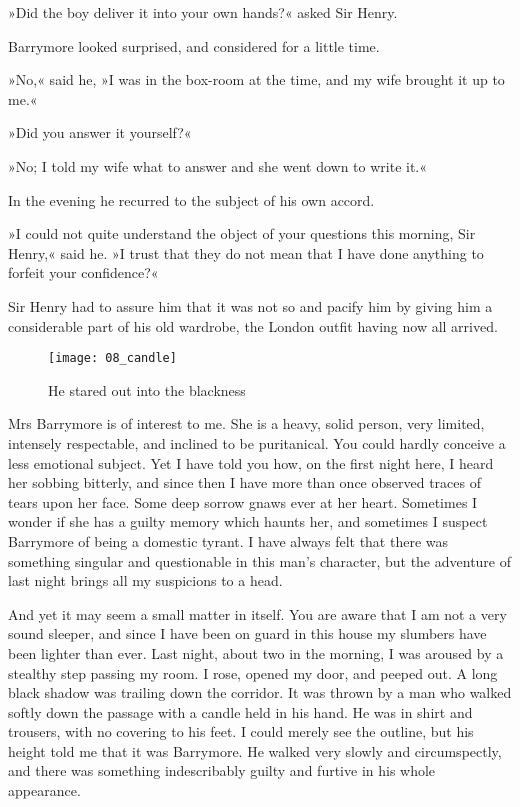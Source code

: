 »Did the boy deliver it into your own hands?« asked Sir Henry.

Barrymore looked surprised, and considered for a little time.

»No,« said he, »I was in the box-room at the time, and my wife brought it up to me.«

»Did you answer it yourself?«

»No; I told my wife what to answer and she went down to write it.«

In the evening he recurred to the subject of his own accord.

»I could not quite understand the object of your questions this morning, Sir Henry,« said he. »I trust that they do not mean that I have done anything to forfeit your confidence?«

Sir Henry had to assure him that it was not so and pacify him by giving him a considerable part of his old wardrobe, the London outfit having now all arrived.

\begin{wrapfigure}[20]{O}{0.7\textwidth}
\centering
\texttt{[image: 08\_candle]}
\caption{He stared out into the blackness}
\end{wrapfigure}

Mrs Barrymore is of interest to me. She is a heavy, solid person, very limited, intensely respectable, and inclined to be puritanical. You could hardly conceive a less emotional subject. Yet I have told you how, on the first night here, I heard her sobbing bitterly, and since then I have more than once observed traces of tears upon her face. Some deep sorrow gnaws ever at her heart. Sometimes I wonder if she has a guilty memory which haunts her, and sometimes I suspect Barrymore of being a domestic tyrant. I have always felt that there was something singular and questionable in this man's character, but the adventure of last night brings all my suspicions to a head.

And yet it may seem a small matter in itself. You are aware that I am not a very sound sleeper, and since I have been on guard in this house my slumbers have been light\-er than ever. Last night, about two in the morning, I was aroused by a stealthy step pass\-ing my room. I rose, opened my door, and peeped out. A long black sha\-dow was trailing down the corridor. It was thrown by a man who walked softly down the passage with a candle held in his hand. He was in shirt and trousers, with no covering to his feet. I could merely see the outline, but his height told me that it was Barrymore. He walked very slowly and circumspectly, and there was something indescribably guilty and furtive in his whole appearance.

